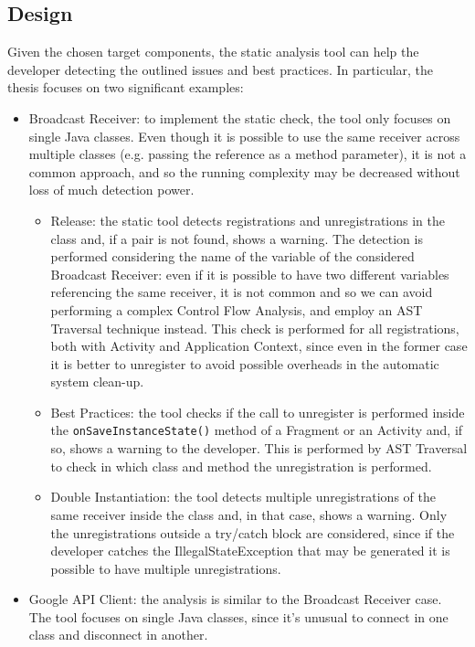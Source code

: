 \documentclass[11pt,a4paper,notitlepage]{article}
\begin{document}
\subsection{Design}
Given the chosen target components, the static analysis tool can help the developer detecting the outlined issues and best practices. In particular, the thesis focuses on two significant examples:
\begin{itemize}
	\item Broadcast Receiver: to implement the static check, the tool only focuses on single Java classes. Even though it is possible to use the same receiver across multiple classes (e.g. passing the reference as a method parameter), it is not a common approach, and so the running complexity may be decreased without loss of much detection power.
	\begin{itemize}
		\item Release: the static tool detects registrations and unregistrations in the class and, if a pair is not found, shows a warning. The detection is performed considering the name of the variable of the considered Broadcast Receiver: even if it is possible to have two different variables referencing the same receiver, it is not common and so we can avoid performing a complex Control Flow Analysis, and employ an AST Traversal technique instead. This check is performed for all registrations, both with Activity and Application Context, since even in the former case it is better to unregister to avoid possible overheads in the automatic system clean-up.
		\item Best Practices: the tool checks if the call to unregister is performed inside the \texttt{onSaveInstanceState()} method of a Fragment or an Activity and, if so, shows a warning to the developer. This is performed by AST Traversal to check in which class and method the unregistration is performed.
		\item Double Instantiation: the tool detects multiple unregistrations of the same receiver inside the class and, in that case, shows a warning. Only the unregistrations outside a try/catch block are considered, since if the developer catches the IllegalStateException that may be generated it is possible to have multiple unregistrations.
	\end{itemize}
	\item Google API Client: the analysis is similar to the Broadcast Receiver case. The tool focuses on single Java classes, since it's unusual to connect in one class and disconnect in another.
	\begin{itemize}

\end{itemize}
\end{itemize}
\end{document}
